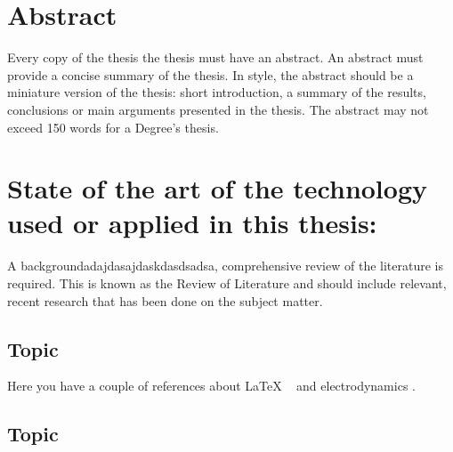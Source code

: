 \documentclass[a4paper,12pt]{article}
\begin{document}
\newpage
\tableofcontents

\newpage
\listoffigures
\lstlistoflistings
\listoftables

\newpage

\newpage
\section*{Abstract}

{Every copy of the thesis the thesis must have an abstract. An abstract must provide a concise summary of the thesis. In style, the
abstract should be a miniature version of the thesis: short introduction, a summary of the results, conclusions or main
arguments presented in the thesis. The abstract may not exceed 150 words for a Degree’s thesis.}

\newpage


\newpage



\clearpage\section{State of the art of the technology used or applied in this thesis:}

{A backgroundadajdasajdaskdasdsadsa, comprehensive review of the literature is required. This is known as the Review of Literature and should
include relevant, recent research that has been done on the subject matter.}

\subsection{Topic}

Here you have a couple of references about LaTeX ~\cite{latexcompanion} and electrodynamics \cite{einstein}.

\bigskip

\subsection{Topic}


\end{document}
